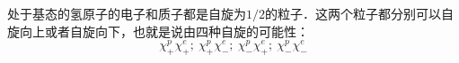 
处于基态的氢原子的电子和质子都是自旋为$1/2$的粒子．这两个粒子都分别可以自旋向上或者自旋向下，也就是说由四种自旋的可能性：
\begin{equation}
\chi^p_+\chi^e_+;\ \chi^p_+\chi^e_-;\ \chi^p_-\chi^e_+;\ \chi^p_-\chi^e_-
\end{equation}
